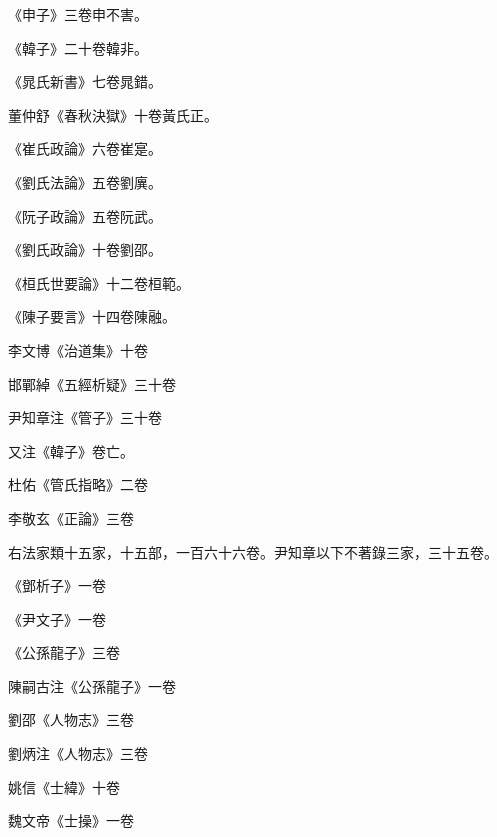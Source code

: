 \begin{pinyinscope}
 《申子》三卷申不害。



 《韓子》二十卷韓非。



 《晁氏新書》七卷晁錯。



 董仲舒《春秋決獄》十卷黃氏正。



 《崔氏政論》六卷崔寔。



 《劉氏法論》五卷劉廙。



 《阮子政論》五卷阮武。



 《劉氏政論》十卷劉邵。



 《桓氏世要論》十二卷桓範。



 《陳子要言》十四卷陳融。



 李文博《治道集》十卷



 邯鄲綽《五經析疑》三十卷



 尹知章注《管子》三十卷



 又注《韓子》卷亡。



 杜佑《管氏指略》二卷



 李敬玄《正論》三卷



 右法家類十五家，十五部，一百六十六卷。尹知章以下不著錄三家，三十五卷。



 《鄧析子》一卷



 《尹文子》一卷



 《公孫龍子》三卷



 陳嗣古注《公孫龍子》一卷



 劉邵《人物志》三卷



 劉炳注《人物志》三卷



 姚信《士緯》十卷



 魏文帝《士操》一卷




\end{pinyinscope}
